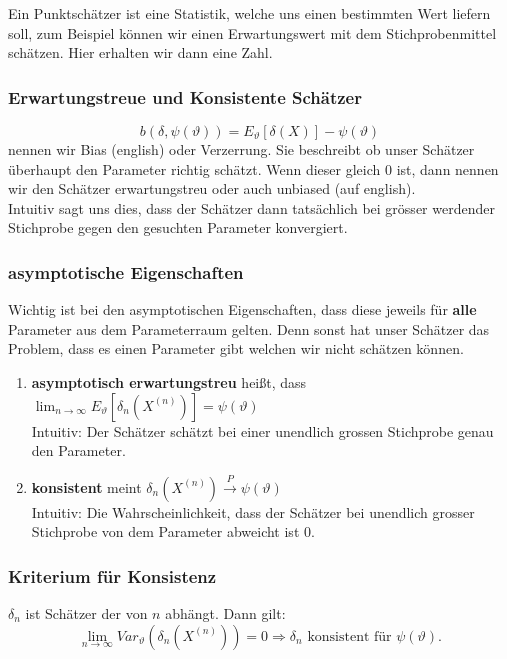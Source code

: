 \documentclass[a4paper]{article}
\begin{document}
\begin{theorem}
	Ein Punktschätzer ist eine Statistik, welche uns einen bestimmten Wert
	liefern soll, zum Beispiel können wir einen Erwartungswert mit dem
	Stichprobenmittel schätzen. Hier erhalten wir dann eine Zahl.

	\subsubsection{Erwartungstreue und Konsistente Schätzer}
	\[
		b(\delta, \psi(\vartheta)) = E_\vartheta \left[
			\delta (X)
		\right] - \psi (\vartheta)
	\] 
	nennen wir Bias (english) oder Verzerrung. Sie beschreibt ob unser Schätzer
	überhaupt den Parameter richtig schätzt.
	Wenn dieser gleich 0 ist, dann nennen wir den Schätzer erwartungstreu oder
	auch unbiased (auf english).
	\\

	Intuitiv sagt uns dies, dass der Schätzer dann tatsächlich bei grösser
	werdender Stichprobe gegen den gesuchten Parameter konvergiert.

	\subsubsection{asymptotische Eigenschaften}
	Wichtig ist bei den asymptotischen Eigenschaften, dass diese jeweils
	für \textbf{alle} Parameter aus dem Parameterraum gelten.
	Denn sonst hat unser Schätzer das Problem, dass es einen Parameter gibt
	welchen wir nicht schätzen können.

	\begin{enumerate}
		\item \textbf{asymptotisch erwartungstreu} heißt, dass
			$\lim_{n \to \infty} E_\vartheta \left[
				\delta_n (X ^{(n)})
			\right] = \psi( \vartheta )$
			\\
			Intuitiv: Der Schätzer schätzt bei einer unendlich grossen Stichprobe
			genau den Parameter.
		\item \textbf{konsistent} meint $\delta_n \left(
				X ^{(n)}
			\right) \overset{P} \longrightarrow \psi (\vartheta)$
			\\
			Intuitiv: Die Wahrscheinlichkeit, dass der Schätzer bei unendlich
			grosser Stichprobe von dem Parameter abweicht ist 0.
	\end{enumerate}

	\subsubsection{Kriterium für Konsistenz}
	$\delta_n$ ist Schätzer der von $n$ abhängt. Dann gilt:
	\[
	\lim_{n \to \infty} Var_\vartheta \left(
		\delta_n (X ^{(n)})
	\right) = 0 \Rightarrow \delta_n \text{ konsistent für } \psi(\vartheta).
	\] 
\end{theorem}
\end{document}
